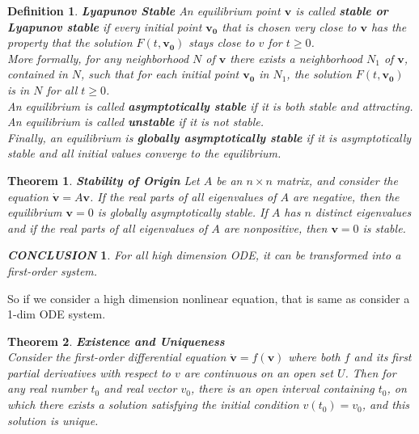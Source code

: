 \documentclass[12pt]{article}
\theoremstyle{plain}
\newtheorem{theorem}{\textbf{Theorem}}[section]
\newtheorem{definition}{{\color{red}\textbf{Definition}}}[section]
\newtheorem{conclusion}{\textit{\textbf{CONCLUSION}}}[section]
\begin{document}
\begin{definition}\textbf{Lyapunov Stable}
An equilibrium point $\mathbf{v}$ is called \textbf{stable or Lyapunov stable} if every initial point $\mathbf{v_0}$ that is chosen very close to $\mathbf{v}$ has the property that the solution $F(t, \mathbf{v_0})$ stays close to $v$ for $t \geq 0$.
\\\noindent More formally, for any neighborhood $N$ of $\mathbf{v}$ there exists a neighborhood $N_1$ of $\mathbf{v}$, contained in $N$, such that for each initial point $\mathbf{v_0}$ in $N_1$, the solution $F(t, \mathbf{v_0})$ is in $N$ for all $t \geq 0$. 
\\\noindent An equilibrium is called \textbf{asymptotically stable} if it is both stable and attracting. 
\\\noindent An equilibrium is called \textbf{unstable} if it is not stable. 
\\\noindent Finally, an equilibrium is \textbf{globally asymptotically stable} if it is asymptotically stable and all initial values converge to the equilibrium.
\end{definition}



\begin{theorem}\textbf{Stability of Origin}
Let $A$ be an $n \times n$ matrix, and consider the equation $ {\mathbf{\dot v}} = A \mathbf{v}$. If the real parts of all eigenvalues of $A$ are negative, then the equilibrium $\mathbf v = 0$ is globally asymptotically stable. If $A$ has $n$ distinct eigenvalues and if the real parts of all eigenvalues of $A$ are nonpositive, then $\mathbf v = 0$ is stable.
\end{theorem}



\begin{conclusion} For all high dimension ODE, it can be transformed into a first-order system.
\end{conclusion}


So if we consider a high dimension nonlinear equation, that is same as consider a 1-dim ODE system.


\begin{theorem}\textbf{Existence and Uniqueness}
\\\noindent Consider the first-order differential equation $\dot {\mathbf v} = f(\mathbf v)$ where both $f$ and its first partial derivatives with respect to $v$ are continuous on an open set $U$. Then for any real number $t_0$ and real vector $v_0$, there is an open interval containing $t_0$, on which there exists a solution satisfying the initial condition $v(t_0) = v_0$, and this solution is unique.
\end{theorem}
\end{document}
